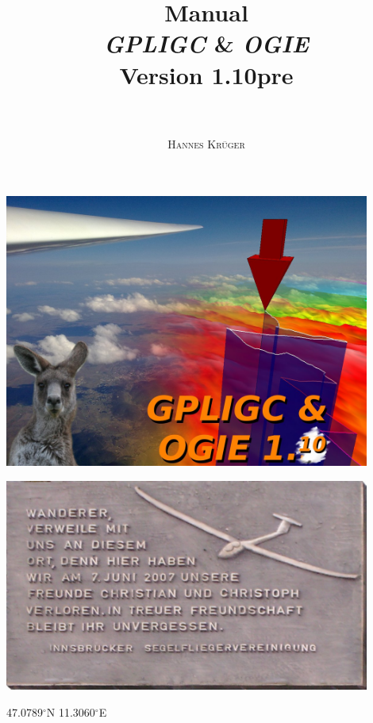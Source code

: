 \documentclass[a4paper,10pt]{article}
\title{
{\huge \textbf{Manual}}\\
\emph{GPLIGC} \& \emph{OGIE}\\
{\small Version 1.10pre}\\
~\\
}
\author{\textsc{Hannes Kr\"uger}}
\begin{document}
\maketitle
\begin{center}
\includegraphics[width=12cm]{jpg/logo}
\end{center}

\newpage

\thispagestyle{empty}
\begin{center}
\includegraphics[width=12cm]{png/CC}
\end{center}
47.0789$^\circ$N 11.3060$^\circ$E

\newpage
\tableofcontents
\sloppy





%       
%       
%       






\begin{appendix}






%



\end{appendix}




\end{document}
